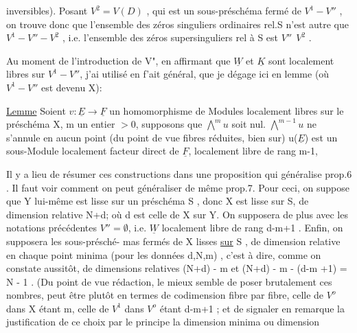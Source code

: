 
inversibles). Posant $V^2 = V(D)$ , qui est un sous-préschéma fermé de
$V^1-V''$ , on trouve donc que l'ensemble des  zéros singuliers
ordinaires rel.S n'est autre que $V^1 - V'' - V^2$ , i.e. l'ensemble des
zéros supersinguliers  rel à S est $V''\ \ V^2$ .

\margin{$\|$} Au moment de l'introduction de V", en affirmant que $\underline{W}$ et $\underline{K}$ sont
localement libres sur $V^1-V''$, j'ai utilisé en f'ait général, que je dégage
ici en lemme (où $V^1-V''$ est devenu X):

\uline{Lemme} Soient $v\colon \underline{E} \to \underline{F}$ un homomorphisme de Modules localement libres
sur le préschéma X,  m un entier $>0$, supposons que $\bigwedge^{m} u$ soit
nul.  
$\bigwedge^{m-1} u$ ne s'annule en aucun point (du point de vue fibres réduites, bien
sur)   u($\underline{E}$) est un sous-Module localement facteur direct de $\underline{F}$,
localement libre de rang m-1, 

Il y a lieu de résumer ces constructions dans une proposition
qui généralise prop.6 . Il faut voir comment on peut généraliser de même
prop.7. Pour ceci, on suppose que Y lui-même est lisse sur un préschéma
S ,  donc X est lisse sur S, de dimension relative N+d\unsure{\hand{$^*$}}; où d est celle de X
sur Y. On supposera de plus avec les notations précédentes $V''=\emptyset$, i.e.
$\underline{W}$ localement libre de rang d-m+1 . Enfin, on supposera les sous-présché-%
mas fermés   de X lisses \uline{sur} S , de dimension relative  en chaque
point minima (pour les données d,N,m) ,  c'est à dire, comme
on constate aussitôt, de dimensions relatives (N+d) - m et
(N+d) - m - (d-m +1) = N - 1 . (Du point de vue rédaction, le mieux
semble de poser brutalement ces nombres, peut être plutôt en termes
de codimension fibre par fibre, celle de $V^o$ dans X étant m, celle de
$V^1$ dans $V^o$ étant d-m+1 ; et de signaler en remarque la justification
de ce choix par le principe  la dimension minima ou dimension 

